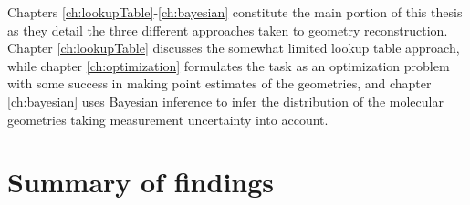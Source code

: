 Chapters \ref{ch:lookupTable}-\ref{ch:bayesian} constitute the main portion of this thesis as they detail the three different approaches taken to geometry reconstruction. Chapter \ref{ch:lookupTable} discusses the somewhat limited lookup table approach, while chapter \ref{ch:optimization} formulates the task as an optimization problem with some success in making point estimates of the geometries, and chapter \ref{ch:bayesian} uses Bayesian inference to infer the distribution of the molecular geometries taking measurement uncertainty into account.

\section{Summary of findings}
